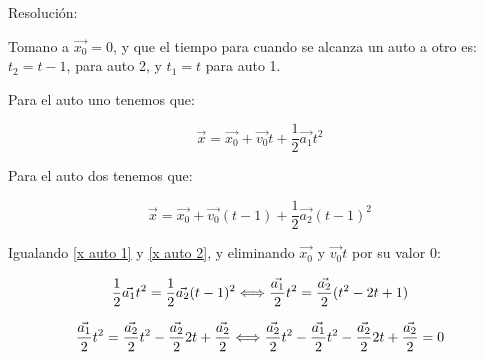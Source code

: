 \documentclass[12pt,letterpaper]{article}
\begin{document}
\begin{enumerate}
\begin{enumerate}
            Resolución:\newline

            Tomano a $\vec{x_{0}}=0$, y que el tiempo para cuando se alcanza un auto a otro es: $t_{2}=t-1$, para auto 2, y $t_{1}=t$ para auto 1.\newline
            
            Para el auto uno tenemos que:

                \begin{equation}
                    \label{x auto 1}
                    \vec{x}=\vec{x_{0}}+\vec{v_{0}}t+\frac{1}{2}\vec{a_{1}}t^{2}
                \end{equation}
            
            Para el auto dos tenemos que:

                \begin{equation}
                    \label{x auto 2}
                    \vec{x}=\vec{x_{0}}+\vec{v_{0}}(t-1)+\frac{1}{2}\vec{a_{2}}(t-1)^{2}
                \end{equation}

            Igualando \ref{x auto 1} y \ref{x auto 2}, y eliminando $\vec{x_{0}}$ y $\vec{v_{0}}t$ por su valor 0:

                \begin{equation}
                    \label{Part 1 t pa x2=x1}
                    \frac{1}{2}\vec{a_{1}}t^{2}
                    =
                    \frac{1}{2}\vec{a_{2}}(t-1)^{2}\\ \\
                    \Longleftrightarrow \\ \\
                    \frac{\vec{a_{1}}}{2}t^{2}
                    =
                    \frac{\vec{a_{2}}}{2}(t^{2}-2t+1)
                \end{equation}

                \begin{equation}
                    \label{Part 2 t pa x2=x1}
                    \frac{\vec{a_{1}}}{2}t^{2}
                    =
                    \frac{\vec{a_{2}}}{2}t^{2}-\frac{\vec{a_{2}}}{2}2t+\frac{\vec{a_{2}}}{2}\\ \\
                    \Longleftrightarrow \\ \\
                    \frac{\vec{a_{2}}}{2}t^{2}-\frac{\vec{a_{1}}}{2}t^{2}-\frac{\vec{a_{2}}}{2}2t+\frac{\vec{a_{2}}}{2}=0
                \end{equation}
            

\end{enumerate}
\end{enumerate}
\end{document}

